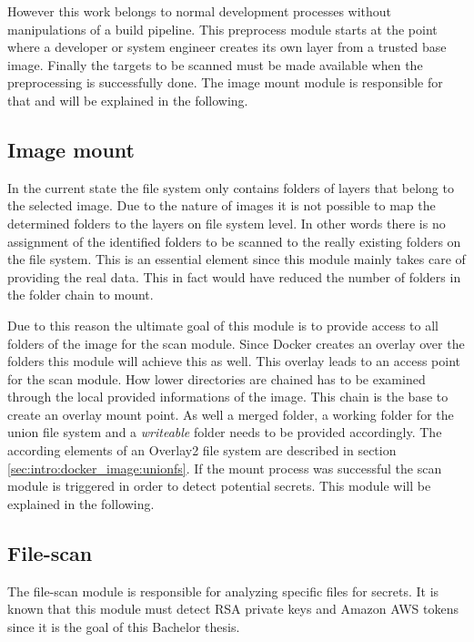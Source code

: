However this work belongs to normal development processes without manipulations of a build pipeline.
This preprocess module starts at the point where a developer or system engineer creates its own layer from a trusted base image.
Finally the targets to be scanned must be made available when the preprocessing is successfully done. 
The image mount module is responsible for that and will be explained in the following.

\subsection{Image mount}
\label{ch:theory:analyzing_process:imgmount}
In the current state the file system only contains folders of layers that belong to the selected image.
Due to the nature of images it is not possible to map the determined folders to the layers on file system level. 
In other words there is no assignment of the identified folders to be scanned to the really existing folders on the file system.
This is an essential element since this module mainly takes care of providing the real data. 
This in fact would have reduced the number of folders in the folder chain to mount. 

Due to this reason the ultimate goal of this module is to provide access to all folders of the image for the scan module. 
Since Docker creates an overlay over the folders this module will achieve this as well. 
This overlay leads to an access point for the scan module. 
How lower directories are chained has to be examined through the local provided informations of the image.
This chain is the base to create an overlay mount point.
As well a merged folder, a working folder for the union file system and a \textit{writeable} folder needs to be provided accordingly.
The according elements of an Overlay2 file system are described in section \ref{sec:intro:docker_image:unionfs}.
If the mount process was successful the scan module is triggered in order to detect potential secrets. 
This module will be explained in the following.

\subsection{File-scan}
\label{ch:theory:analyzing_process:scan}
The file-scan module is responsible for analyzing specific files for secrets. 
It is known that this module must detect RSA private keys and Amazon AWS tokens since it is the goal of this Bachelor thesis.

